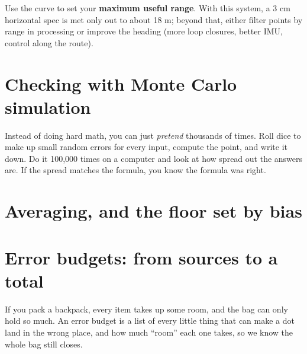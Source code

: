 
\begin{tip}
Use the curve to set your \textbf{maximum useful range}. With this system, a 3 cm horizontal spec is met only out to about 18 m; beyond that, either filter points by range in processing or improve the heading (more loop closures, better IMU, control along the route).
\end{tip}

\section{Checking with Monte Carlo simulation}

\begin{kid}
Instead of doing hard math, you can just \emph{pretend} thousands of times. Roll dice to make up small random errors for every input, compute the point, and write it down. Do it 100,000 times on a computer and look at how spread out the answers are. If the spread matches the formula, you know the formula was right.
\end{kid}


\section{Averaging, and the floor set by bias}


\section{Error budgets: from sources to a total}\label{sec:budgets}

\begin{kid}
If you pack a backpack, every item takes up some room, and the bag can only hold so much. An error budget is a list of every little thing that can make a dot land in the wrong place, and how much ``room'' each one takes, so we know the whole bag still closes.
\end{kid}


